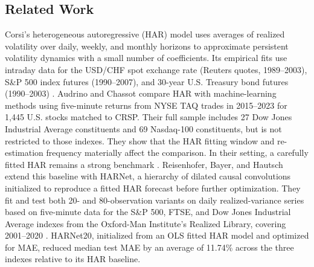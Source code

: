 \documentclass[12pt,a4paper]{article}
\numberwithin{equation}{section}
\numberwithin{table}{section}
\numberwithin{figure}{section}
\begin{document}
\subsection{Related Work}
Corsi's heterogeneous autoregressive (HAR) model uses averages of realized volatility over daily, weekly, and monthly horizons to approximate persistent volatility dynamics with a small number of coefficients. Its empirical fits use intraday data for the USD/CHF spot exchange rate (Reuters quotes, 1989--2003), S\&P 500 index futures (1990--2007), and 30-year U.S. Treasury bond futures (1990--2003) \cite{corsi2009}. Audrino and Chassot compare HAR with machine-learning methods using five-minute returns from NYSE TAQ trades in 2015--2023 for 1,445 U.S. stocks matched to CRSP. Their full sample includes 27 Dow Jones Industrial Average constituents and 69 Nasdaq-100 constituents, but is not restricted to those indexes. They show that the HAR fitting window and re-estimation frequency materially affect the comparison. In their setting, a carefully fitted HAR remains a strong benchmark \cite{audrino2024}. Reisenhofer, Bayer, and Hautsch extend this baseline with HARNet, a hierarchy of dilated causal convolutions initialized to reproduce a fitted HAR forecast before further optimization. They fit and test both 20- and 80-observation variants on daily realized-variance series based on five-minute data for the S\&P 500, FTSE, and Dow Jones Industrial Average indexes from the Oxford-Man Institute's Realized Library, covering 2001--2020 \cite{reisenhofer2022}. HARNet20, initialized from an OLS fitted HAR model and optimized for MAE, reduced median test MAE by an average of 11.74\% across the three indexes relative to its HAR baseline.
\end{document}
